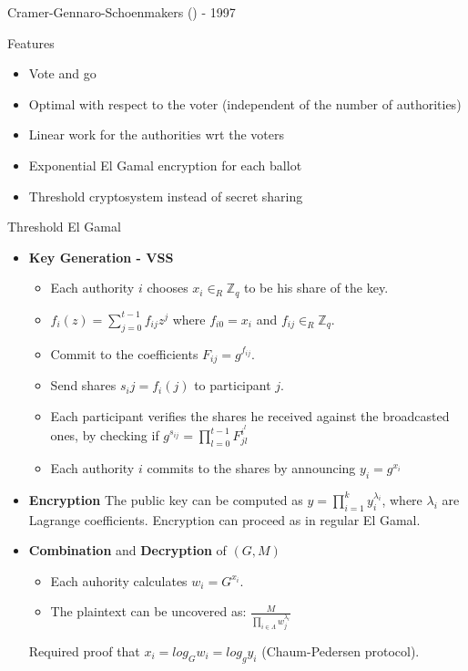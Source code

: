 \documentclass{beamer}
\begin{document}
\begin{frame}[allowframebreaks]{Cramer-Gennaro-Schoenmakers (\cite{CGS97}) - 1997}
\begin{block}{Features} 
\begin{itemize}
\item Vote and go
\item Optimal with respect to the voter (independent of the number of authorities)
\item Linear work for the authorities wrt the voters
\item Exponential El Gamal encryption for each ballot
\item Threshold cryptosystem instead of secret sharing
\end{itemize}
\end{block}
\end{frame}

\begin{frame}{Threshold El Gamal}

\begin{itemize}
\item \textbf{Key Generation - VSS} 
\begin{itemize}
\item Each authority $i$ chooses $x_i \in_R \mathbb{Z}_q$ to be his share of the key. 
\item $f_i(z) = \sum_{j=0}^{t-1} f_{ij}z^j$ where  $f_{i0} = x_i$ and $f_{ij} \in_R \mathbb{Z}_q$.
\item Commit to the coefficients $F_{ij}=g^{f_{ij}}$. 
\item Send shares $s_ij=f_{i}(j)$ to participant $j$. 
\item Each participant verifies the shares he received against the broadcasted ones, by checking if $g^{s_{ij}} = \prod_{l=0}^{t-1} F_{jl}^{i^l}$
\item Each authority $i$ commits to the shares by announcing $y_i = g^{x_i}$
\end{itemize} 
\item \textbf{Encryption}
The public key can be computed as $y=\prod_{i=1}^k y_i^{\lambda_i}$, where $\lambda_i$ are Lagrange coefficients.  Encryption can proceed as in regular El Gamal.
\item \textbf{Combination} and \textbf{Decryption} of  $(G,M)$
\begin{itemize}
\item Each auhority calculates $w_i = G^{x_i}$. 
\item The plaintext can be uncovered as: $\frac{M}{\prod_{i \in \Lambda}w_j^{\lambda_i}}$
\end{itemize}
Required proof that $x_i = log_G w_i = log_g y_i$ (Chaum-Pedersen protocol).
\end{itemize}

\end{frame} 
\end{document}

